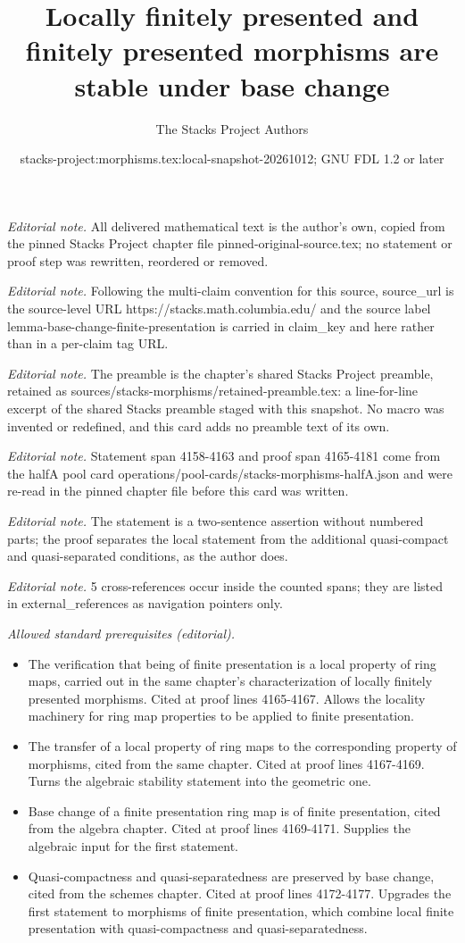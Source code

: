 \documentclass[10pt,a4paper]{amsart}
\title{Locally finitely presented and finitely presented morphisms are stable under base change}
\author{The Stacks Project Authors}
\date{stacks-project:morphisms.tex:local-snapshot-20261012; GNU FDL 1.2 or later}
\theoremstyle{plain}
\theoremstyle{definition}
\theoremstyle{remark}
\numberwithin{equation}{subsection}
\begin{document}
\maketitle
\noindent\textit{Editorial note.} All delivered mathematical text is the author's own, copied from the pinned Stacks Project chapter file pinned-original-source.tex; no statement or proof step was rewritten, reordered or removed.\par\medskip
\noindent\textit{Editorial note.} Following the multi-claim convention for this source, source\_url is the source-level URL https://stacks.math.columbia.edu/ and the source label lemma-base-change-finite-presentation is carried in claim\_key and here rather than in a per-claim tag URL.\par\medskip
\noindent\textit{Editorial note.} The preamble is the chapter's shared Stacks Project preamble, retained as sources/stacks-morphisms/retained-preamble.tex: a line-for-line excerpt of the shared Stacks preamble staged with this snapshot. No macro was invented or redefined, and this card adds no preamble text of its own.\par\medskip
\noindent\textit{Editorial note.} Statement span 4158-4163 and proof span 4165-4181 come from the halfA pool card operations/pool-cards/stacks-morphisms-halfA.json and were re-read in the pinned chapter file before this card was written.\par\medskip
\noindent\textit{Editorial note.} The statement is a two-sentence assertion without numbered parts; the proof separates the local statement from the additional quasi-compact and quasi-separated conditions, as the author does.\par\medskip
\noindent\textit{Editorial note.} 5 cross-references occur inside the counted spans; they are listed in external\_references as navigation pointers only.\par\medskip
\noindent\textit{Allowed standard prerequisites (editorial).}\begin{itemize}
\item The verification that being of finite presentation is a local property of ring maps, carried out in the same chapter's characterization of locally finitely presented morphisms. Cited at proof lines 4165-4167. Allows the locality machinery for ring map properties to be applied to finite presentation.
\item The transfer of a local property of ring maps to the corresponding property of morphisms, cited from the same chapter. Cited at proof lines 4167-4169. Turns the algebraic stability statement into the geometric one.
\item Base change of a finite presentation ring map is of finite presentation, cited from the algebra chapter. Cited at proof lines 4169-4171. Supplies the algebraic input for the first statement.
\item Quasi-compactness and quasi-separatedness are preserved by base change, cited from the schemes chapter. Cited at proof lines 4172-4177. Upgrades the first statement to morphisms of finite presentation, which combine local finite presentation with quasi-compactness and quasi-separatedness.
\end{itemize}\medskip
\end{document}
